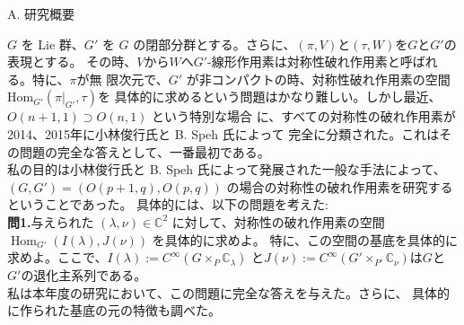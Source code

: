 \documentclass[a4j,twocolumn]{jarticle}
\begin{document}
\vspace{0.2cm}
\noindent
A. 研究概要

\vspace{0.1cm}

$G$ を Lie 群、$G'$ を $G$ の閉部分群とする。さらに、$(\pi,V)$と$(\tau,W)$を$G$と$G'$の表現とする。
その時、$V$から$W$へ$G'$-線形作用素は対称性破れ作用素と呼ばれる。特に、$\pi$が無
限次元で、$G'$ が非コンパクトの時、対称性破れ作用素の空間$\mbox{Hom}_{G'}(\pi\big|_{G'},\tau)$を
具体的に求めるという問題はかなり難しい。しかし最近、$O(n + 1, 1) \supset O(n, 1)$ という特別な場合
に、すべての対称性の破れ作用素が2014、2015年に小林俊行氏と B. Speh 氏によって
完全に分類された。これはその問題の完全な答えとして、一番最初である。\\
私の目的は小林俊行氏と B. Speh 氏によって発展された一般な手法によって、$(G, G') = (O(p+1,q),O(p,q))$
の場合の対称性の破れ作用素を研究するということであった。
具体的には、以下の問題を考えた:\\
{\noindent}\textbf{問\textbf{1}.}{与えられた $( \lambda, \nu) \in
\mathbb{C}^2$
に対して、対称性の破れ作用素の空間 $\operatorname{Hom}_{G'}(I(\lambda),J(\nu))$ を具体的に求めよ。
特に、この空間の基底を具体的に求めよ。ここで、$I(\lambda):=C^{\infty}\left(  G\times_P\mathbb{C}_\lambda\right)$
と$J(\nu):=C^{\infty}\left( G'\times_{P'}\mathbb{C}_{\nu} \right)$は$G$と
$G'$の退化主系列である。}\\
私は本年度の研究において、この問題に完全な答えを与えた。さらに、
具体的に作られた基底の元の特徴も調べた。
\end{document}
